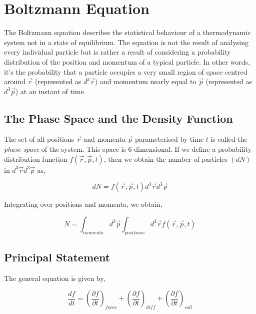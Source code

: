 \newpage
\chapter{Boltzmann Equation}

The Boltzmann equation describes the statistical behaviour of a thermodynamic system not in a state of equilibrium. The equation is not the result of analysing every individual particle but is rather a result of considering a probability distribution of the position and momentum of a typical particle. In other words, it's the probability that a particle occupies a very small region of space centred around $ \vec{r} $ (represented as $ d^3\vec{r} $) and momentum nearly equal to $ \vec{p} $ (represented as $ d^3\vec{p} $) at an instant of time.

\section{The Phase Space and the Density Function}

The set of all positions $\vec{r}$ and momenta $\vec{p}$ parameterised by time $t$ is called the \textit{phase space} of the system. This space is 6-dimensional. If we define a probability distribution function $ f(\vec{r}, \vec{p}, t) $, then we obtain the number of particles $(dN)$ in $ d^3 \vec{r} d^3 \vec{p}$ as,

\begin{equation}
	dN = f(\vec{r}, \vec{p}, t) d^3 \vec{r} d^3 \vec{p}
\end{equation}

\no Integrating over positions and momenta, we obtain,

\begin{equation}
	N = \int_{momenta} d^3 \vec{p} \int_{positions} d^3 \vec{r} f(\vec{r}, \vec{p}, t)
\end{equation}

\section{Principal Statement}

\no The general equation is given by,

\begin{equation}
	\frac{df}{dt} = \left( \frac{\partial f}{\partial t} \right)_{force} + \left( \frac{\partial f}{\partial t} \right)_{diff} + \left( \frac{\partial f}{\partial t} \right)_{coll}
\end{equation}

